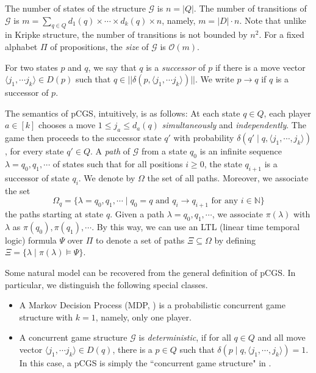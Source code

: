 \documentclass[times, 10 pt,twocolumn]{article}
\newcommand{\mb}[1]{\mathbb{#1}}
\newcommand{\mc}[1]{\mathcal{#1}}
\newcommand{\la}{\langle}
\newcommand{\ra}{\rangle}
\begin{document}
The number of states of the structure $\mc{G}$ is $n=|Q|$. The
number of transitions of $\mc{G}$ is $m=\sum_{q\in
Q}d_1(q)\times\cdots\times d_k(q)\times n$, namely, $m=|D|\cdot
n$. Note that unlike in Kripke structure, the number of
transitions is not bounded by $n^2$. For a fixed alphabet $\Pi$ of
propositions, the \emph{size} of $\mc{G}$ is $\mc{O}(m)$.

For two states $p$ and $q$, we say that $q$ is a \emph{successor}
of $p$ if there is a move vector $\la j_1, \cdots j_k\ra\in D(p)$
such that $q\in ||\delta(p, \la j_1, \cdots j_k\ra)||$. We write
$p\rightarrow q$ if $q$ is a successor of $p$.


The semantics of pCGS, intuitively, is as follows: At each state
$q\in Q$, each player $a\in[k]$ chooses a move $1\leq j_a\leq
d_a(q)$ \emph{simultaneously} and \emph{independently}. The game
then proceeds to the successor state $q'$ with probability
$\delta(q'\mid q, \la j_1, \cdots, j_k\ra)$, for every state
$q'\in Q$. A \emph{path} of $\mc{G}$ from a state $q_0$ is an
infinite sequence $\lambda= q_0, q_1, \cdots$ of states such that
for all positions $i\geq 0$, the state $q_{i+1}$ is a successor of
state $q_i$. We denote by $\Omega$ the set of all paths. Moreover,
we associate the set
\[\Omega_q = \{\lambda= q_0, q_1, \cdots \mid q_0=q \mbox{ and }q_i\rightarrow q_{i+1}\mbox{ for any }i\in \mb{N}\}\]
the paths starting at state $q$. %
Given a path $\lambda=q_0,q_1, \cdots$, we associate
$\pi(\lambda)$ with $\lambda$ as $\pi(q_0),\pi(q_1),\cdots$. By
this way, we can use an LTL (linear time temporal logic) formula
$\Psi$ over $\Pi$ to denote a set of paths $\Xi\subseteq \Omega$
by defining $\Xi=\{\lambda\mid \pi(\lambda)\models \Psi\}$.%

\vspace{2mm} Some natural model can be recovered from the general
definition of pCGS. In particular, we distinguish the following
special classes.

\begin{itemize}
  \item  A Markov Decision Process (MDP, \cite{Put94}) is a
  probabilistic concurrent game structure with $k=1$, namely, only
  one player.

  \item A concurrent game structure $\mc{G}$ is \emph{deterministic},
  if for all $q\in Q$ and all move vector $\la j_1, \cdots
  j_k\ra\in D(q)$, there is a $p\in Q$ such that
  $\delta(p \mid q, \la j_1, \cdots, j_k\ra)=1$. %
  In this case,
  a pCGS is %
  simply %
  the ``concurrent game structure" in \cite{AHK02}.
\end{itemize}
\end{document}
